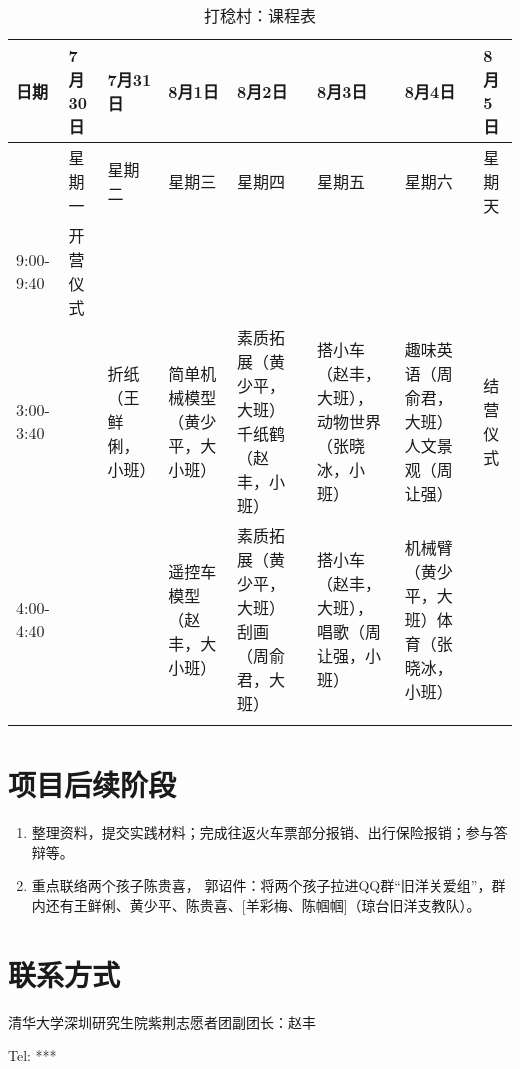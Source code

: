 \documentclass[12pt]{ctexart}
\def\CurriculumScheduleWidth{1.6cm}
\begin{document}
\begin{longtable}{|p{\CurriculumScheduleWidth}|p{\CurriculumScheduleWidth}|p{\CurriculumScheduleWidth}|p{\CurriculumScheduleWidth}|p{\CurriculumScheduleWidth}|p{\CurriculumScheduleWidth}|p{\CurriculumScheduleWidth}|p{\CurriculumScheduleWidth}|}
\hline
日期 & 7月30日 & 7月31日 & 8月1日 & 8月2日 & 8月3日 & 8月4日 & 8月5日 \\
\hline
& 星期一 & 星期二 & 星期三 & 星期四 & 星期五 & 星期六 & 星期天 \\
\hline
9:00-9:40 & 开营仪式 &   & &  & &  &   \\
\hline
3:00-3:40  &  & 折纸（王鲜俐，小班） &  简单机械模型（黄少平，大小班） & 素质拓展（黄少平，大班）千纸鹤（赵丰，小班） & 搭小车（赵丰，大班），动物世界（张晓冰，小班） & 趣味英语（周俞君，大班）人文景观（周让强） &  结营仪式 \\
\hline
4:00-4:40  &  & & 遥控车模型（赵丰，大小班）  & 素质拓展（黄少平，大班）刮画（周俞君，大班） & 搭小车（赵丰，大班），唱歌（周让强，小班） & 机械臂（黄少平，大班）体育（张晓冰，小班） & \\
\hline
\caption{打稔村：课程表}\label{curriculum_schedule}
\end{longtable}

\section{项目后续阶段}
\begin{enumerate}
\item 整理资料，提交实践材料；完成往返火车票部分报销、出行保险报销；参与答辩等。
\item 重点联络两个孩子陈贵喜， 郭诏件：将两个孩子拉进QQ群“旧洋关爱组”，群内还有王鲜俐、黄少平、陈贵喜、[羊彩梅、陈帼帼]（琼台旧洋支教队）。
\end{enumerate}
\section{联系方式}
清华大学深圳研究生院紫荆志愿者团副团长：赵丰

Tel: ***
\end{document}
